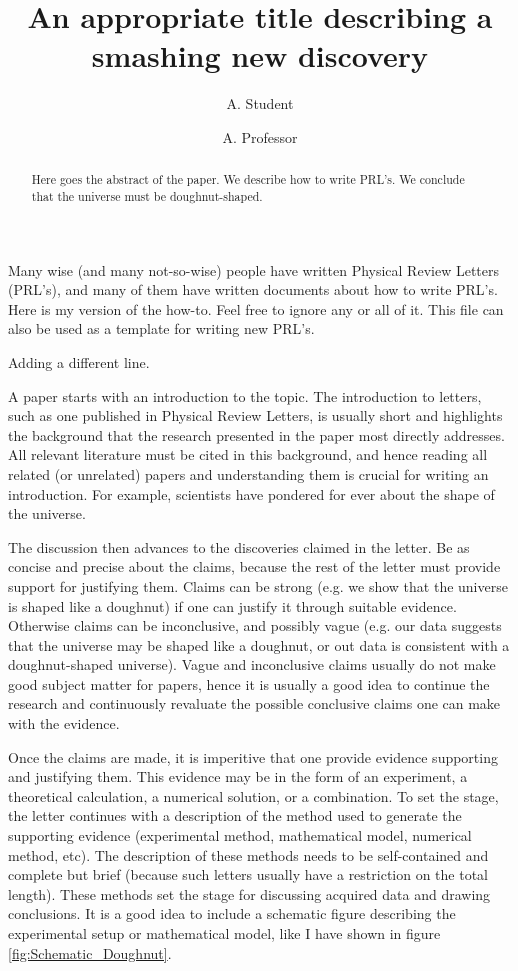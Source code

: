\documentclass[twocolumn,prl]{revtex4-1}
\begin{document}
\title{An appropriate title describing a smashing new discovery}
\author{A. Student}
\author{A. Professor}
\begin{abstract}
Here goes the abstract of the paper. We describe how to write PRL's. We conclude that the universe must be doughnut-shaped.
\end{abstract}
\maketitle

Many wise (and many not-so-wise) people have written Physical Review Letters (PRL's), and many of them have written documents about how to write PRL's. Here is my version of the how-to. Feel free to ignore any or all of it. This file can also be used as a template for writing new PRL's.

Adding a different line.

A paper starts with an introduction to the topic. The introduction to letters, such as one published in Physical Review Letters, is usually short and highlights the background that the research presented in the paper most directly addresses. All relevant literature must be cited in this background, and hence reading all related (or unrelated) papers and understanding them is crucial for writing an introduction. For example, scientists have pondered for ever about the shape of the universe\cite{aurich2004can,ellis2003shape,adams2001shape,gomero2000signature,cornish1998can}.

The discussion then advances to the discoveries claimed in the letter. Be as concise and precise about the claims, because the rest of the letter must provide support for justifying them. Claims can be strong (e.g. we show that the universe is shaped like a doughnut) if one can justify it through suitable evidence. Otherwise claims can be inconclusive, and possibly vague (e.g. our data suggests that the universe may be shaped like a doughnut, or out data is consistent with a doughnut-shaped universe). Vague and inconclusive claims usually do not make good subject matter for papers, hence it is usually a good idea to continue the research and continuously revaluate the possible conclusive claims one can make with the evidence.

Once the claims are made, it is imperitive that one provide evidence supporting and justifying them. This evidence may be in the form of an experiment, a theoretical calculation, a numerical solution, or a combination. To set the stage, the letter continues with a description of the method used to generate the supporting evidence (experimental method, mathematical model, numerical method, etc). The description of these methods needs to be self-contained and complete but brief (because such letters usually have a restriction on the total length). These methods set the stage for discussing acquired data and drawing conclusions. It is a good idea to include a schematic figure describing the experimental setup or mathematical model, like I have shown in figure \ref{fig:Schematic_Doughnut}.
\end{document}
